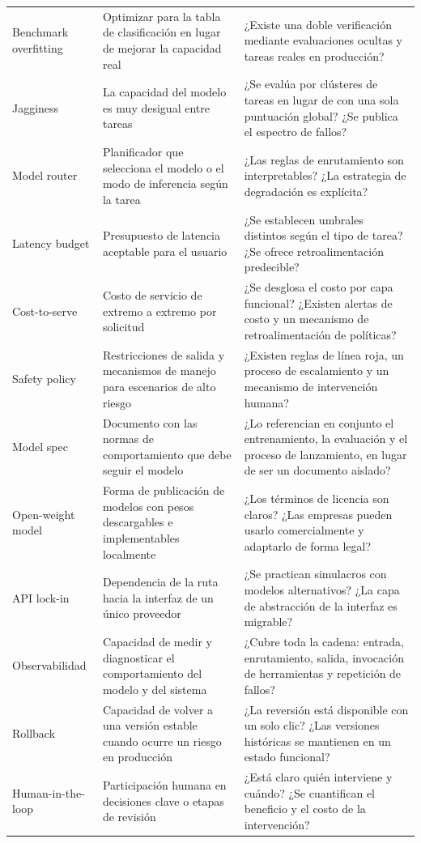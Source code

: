 \begin{longtable}{p{}p{}p{}}
Benchmark overfitting & Optimizar para la tabla de clasificación en lugar de mejorar la capacidad real & ¿Existe una doble verificación mediante evaluaciones ocultas y tareas reales en producción? \\
Jagginess & La capacidad del modelo es muy desigual entre tareas & ¿Se evalúa por clústeres de tareas en lugar de con una sola puntuación global? ¿Se publica el espectro de fallos? \\
Model router & Planificador que selecciona el modelo o el modo de inferencia según la tarea & ¿Las reglas de enrutamiento son interpretables? ¿La estrategia de degradación es explícita? \\
Latency budget & Presupuesto de latencia aceptable para el usuario & ¿Se establecen umbrales distintos según el tipo de tarea? ¿Se ofrece retroalimentación predecible? \\
Cost-to-serve & Costo de servicio de extremo a extremo por solicitud & ¿Se desglosa el costo por capa funcional? ¿Existen alertas de costo y un mecanismo de retroalimentación de políticas? \\
Safety policy & Restricciones de salida y mecanismos de manejo para escenarios de alto riesgo & ¿Existen reglas de línea roja, un proceso de escalamiento y un mecanismo de intervención humana? \\
Model spec & Documento con las normas de comportamiento que debe seguir el modelo & ¿Lo referencian en conjunto el entrenamiento, la evaluación y el proceso de lanzamiento, en lugar de ser un documento aislado? \\
Open-weight model & Forma de publicación de modelos con pesos descargables e implementables localmente & ¿Los términos de licencia son claros? ¿Las empresas pueden usarlo comercialmente y adaptarlo de forma legal? \\
API lock-in & Dependencia de la ruta hacia la interfaz de un único proveedor & ¿Se practican simulacros con modelos alternativos? ¿La capa de abstracción de la interfaz es migrable? \\
Observabilidad & Capacidad de medir y diagnosticar el comportamiento del modelo y del sistema & ¿Cubre toda la cadena: entrada, enrutamiento, salida, invocación de herramientas y repetición de fallos? \\
Rollback & Capacidad de volver a una versión estable cuando ocurre un riesgo en producción & ¿La reversión está disponible con un solo clic? ¿Las versiones históricas se mantienen en un estado funcional? \\
Human-in-the-loop & Participación humana en decisiones clave o etapas de revisión & ¿Está claro quién interviene y cuándo? ¿Se cuantifican el beneficio y el costo de la intervención? \\

\end{longtable}
